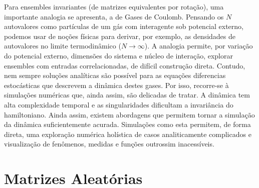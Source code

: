 Para ensembles invariantes (de matrizes equivalentes por rotação), uma importante analogia se apresenta, a de Gases de Coulomb. Pensando os $N$ autovalores como partículas de um gás com interagente sob potencial externo, podemos usar de noções físicas para derivar, por exemplo, as densidades de autovalores no limite termodinâmico ($N \rightarrow \infty$). A analogia permite, por variação do potencial externo, dimensões do sistema e núcleo de interação, explorar ensembles com entradas correlacionadas, de difícil construção direta. Contudo, nem sempre soluções analíticas são possível para as equações diferencias estocásticas que descrevem a dinâmica destes gases. Por isso, recorre-se à simulações numéricas que, ainda assim, são delicadas de tratar. A dinâmica tem alta complexidade temporal e as singularidades dificultam a invariância do hamiltoniano. Ainda assim, existem abordagens que permitem tornar a simulação da dinâmica suficientemente acurada. Simulações como esta permitem, de forma direta, uma exploração numérica holística de casos analiticamente complicados e visualização de fenômenos, medidas e funções outrossim inacessíveis.


\chapter{Matrizes Aleatórias}








